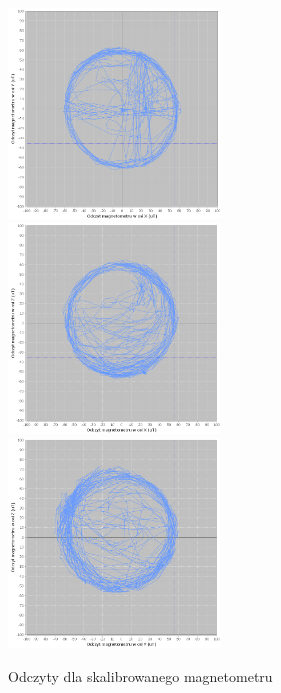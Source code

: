 \begin{figure}[h!]
    \centering
    \includegraphics[width=0.5\textwidth]{Rysunki/Rozdzial03/Magnetometr_skalibrowany_hardiron_XY.png}
    \includegraphics[width=0.5\textwidth]{Rysunki/Rozdzial03/Magnetometr_skalibrowany_hardiron_XZ.png}
    \includegraphics[width=0.5\textwidth]{Rysunki/Rozdzial03/Magnetometr_skalibrowany_hardiron_YZ.png}
    \caption{Odczyty dla skalibrowanego magnetometru}
    \label{Magnetometr skalibrowany}
\end{figure}

